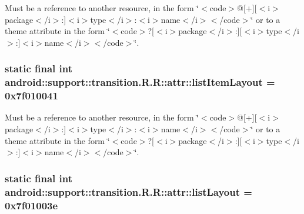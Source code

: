 Must be a reference to another resource, in the form \char`\"{}$<$code$>$@\mbox{[}+\mbox{]}\mbox{[}$<$i$>$package$<$/i$>$:\mbox{]}$<$i$>$type$<$/i$>$:$<$i$>$name$<$/i$>$$<$/code$>$\char`\"{} or to a theme attribute in the form \char`\"{}$<$code$>$?\mbox{[}$<$i$>$package$<$/i$>$:\mbox{]}\mbox{[}$<$i$>$type$<$/i$>$:\mbox{]}$<$i$>$name$<$/i$>$$<$/code$>$\char`\"{}. \hypertarget{classandroid_1_1support_1_1transition_1_1_r_1_1attr_9ff16759f6cc670ad2009337b37823db}{
\subsubsection[{listItemLayout}]{\setlength{\rightskip}{0pt plus 5cm}static final int android::support::transition.R.R::attr::listItemLayout = 0x7f010041}}
\label{classandroid_1_1support_1_1transition_1_1_r_1_1attr_9ff16759f6cc670ad2009337b37823db}


Must be a reference to another resource, in the form \char`\"{}$<$code$>$@\mbox{[}+\mbox{]}\mbox{[}$<$i$>$package$<$/i$>$:\mbox{]}$<$i$>$type$<$/i$>$:$<$i$>$name$<$/i$>$$<$/code$>$\char`\"{} or to a theme attribute in the form \char`\"{}$<$code$>$?\mbox{[}$<$i$>$package$<$/i$>$:\mbox{]}\mbox{[}$<$i$>$type$<$/i$>$:\mbox{]}$<$i$>$name$<$/i$>$$<$/code$>$\char`\"{}. \hypertarget{classandroid_1_1support_1_1transition_1_1_r_1_1attr_dfd28cf430a057d64cf1e6339182eb2a}{
\subsubsection[{listLayout}]{\setlength{\rightskip}{0pt plus 5cm}static final int android::support::transition.R.R::attr::listLayout = 0x7f01003e}}
\label{classandroid_1_1support_1_1transition_1_1_r_1_1attr_dfd28cf430a057d64cf1e6339182eb2a}


